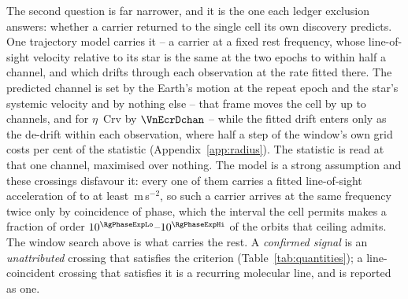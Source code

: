 The second question is far narrower, and it is the one each ledger exclusion
answers: whether a carrier returned to the single cell its own discovery
predicts. One trajectory model carries it -- a carrier at a fixed rest
frequency, whose line-of-sight velocity relative to its star is the same at
the two epochs to within half a channel, and which drifts through each
observation at the rate fitted there. The predicted channel is set by the
Earth's motion at the repeat epoch and the star's systemic velocity and by
nothing else -- that frame moves the cell by up to \ZtFrameChanMax{} channels,
and for $\eta$~Crv by $\VnEcrDchan$ -- while the fitted drift enters only as
the de-drift within each observation, where half a step of the window's own
grid costs \RjDriftPct{} per cent of the statistic
(Appendix~\ref{app:radius}). The statistic is read at that one channel,
maximised over nothing. The model is a strong assumption and these crossings
disfavour it: every one of them carries a fitted line-of-sight acceleration of
\ZtALosLo{} to at least \ZtALosHi\,m\,s$^{-2}$, so such a carrier arrives at the same
frequency twice only by coincidence of phase, which the interval the cell
permits makes a fraction of order $10^{\RgPhaseExpLo}$--$10^{\RgPhaseExpHi}$
of the orbits that ceiling admits. The window search above is what carries the
rest. A
\emph{confirmed signal} is an \emph{unattributed} crossing that satisfies the
criterion (Table~\ref{tab:quantities}); a line-coincident crossing that
satisfies it is a recurring molecular line, and is reported as one.

